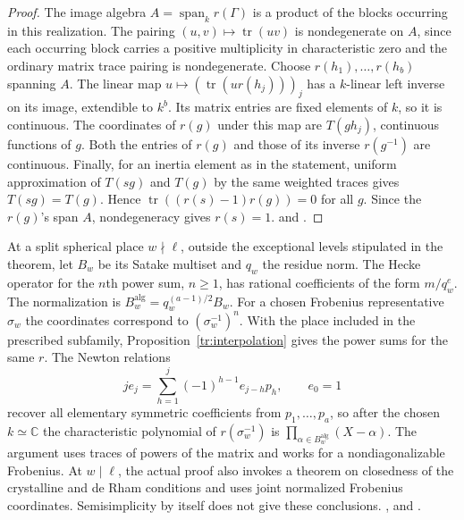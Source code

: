 \begin{proof}
The image algebra \(A=\operatorname{span}_k r(\Gamma)\) is a product of the blocks occurring in this realization. The pairing \((u,v)\mapsto\operatorname{tr}(uv)\) is nondegenerate on \(A\), since each occurring block carries a positive multiplicity in characteristic zero and the ordinary matrix trace pairing is nondegenerate. Choose \(r(h_1),\ldots,r(h_b)\) spanning \(A\). The linear map \(u\mapsto(\operatorname{tr}(ur(h_j)))_j\) has a \(k\)-linear left inverse on its image, extendible to \(k^b\). Its matrix entries are fixed elements of \(k\), so it is continuous. The coordinates of \(r(g)\) under this map are \(T(gh_j)\), continuous functions of \(g\). Both the entries of \(r(g)\) and those of its inverse \(r(g^{-1})\) are continuous. Finally, for an inertia element as in the statement, uniform approximation of \(T(sg)\) and \(T(g)\) by the same weighted traces gives \(T(sg)=T(g)\). Hence \(\operatorname{tr}((r(s)-1)r(g))=0\) for all \(g\). Since the \(r(g)\)'s span \(A\), nondegeneracy gives \(r(s)=1\).  and .
\end{proof}

At a split spherical place \(w\nmid\ell\), outside the exceptional levels stipulated in the theorem, let \(B_w\) be its Satake multiset and \(q_w\) the residue norm. The Hecke operator for the \(n\)th power sum, \(n\ge1\), has rational coefficients of the form \(m/q_w^e\). The normalization is \(B_w^{\mathrm{alg}}=q_w^{(a-1)/2}B_w\). For a chosen Frobenius representative \(\sigma_w\) the coordinates correspond to \((\sigma_w^{-1})^n\). With the place included in the prescribed subfamily, Proposition~\ref{tr:interpolation} gives the power sums for the same \(r\). The Newton relations
\[
 j e_j=\sum_{h=1}^j(-1)^{h-1}e_{j-h}p_h,\qquad e_0=1
\]
recover all elementary symmetric coefficients from \(p_1,\ldots,p_a\), so after the chosen \(k\simeq\mathbb C\) the characteristic polynomial of \(r(\sigma_w^{-1})\) is \(\prod_{\alpha\in B_w^{\mathrm{alg}}}(X-\alpha)\). The argument uses traces of powers of the matrix and works for a nondiagonalizable Frobenius. At \(w\mid\ell\), the actual proof also invokes a theorem on closedness of the crystalline and de Rham conditions and uses joint normalized Frobenius coordinates. Semisimplicity by itself does not give these conclusions. ,  and .

